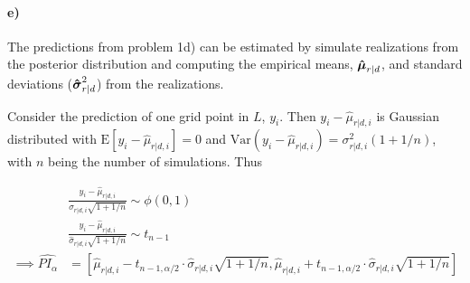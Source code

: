 \paragraph{e)}

The predictions from problem 1d) can be estimated by simulate realizations from the posterior distribution and computing the empirical means, $\boldsymbol{\mathbf{\hat\mu}}_{r|d}$, and standard deviations ($\boldsymbol{\mathbf{\hat\sigma}}^2_{r|d}$) from the realizations. 

Consider the prediction of one grid point in $L$, $y_i$. Then $y_i-\hat\mu_{r|d,i}$ is Gaussian distributed with $\text{E}[y_i-\hat\mu_{r|d,i}] = 0$ and $\text{Var}(y_i-\hat\mu_{r|d,i}) = \sigma^2_{r|d,i}(1+1/n)$, with $n$ being the number of simulations. Thus

\begin{align*}
    &\frac{y_i - \hat\mu_{r|d,i}}{\sigma_{r|d,i}\sqrt{1+1/n}} \sim \phi(0,1)\\
     &\frac{y_i - \hat\mu_{r|d,i}}{\hat\sigma_{r|d,i}\sqrt{1+1/n}} \sim t_{n-1}\\
     \implies \hat{PI_{\alpha}} &= \left[\hat\mu_{r|d,i} - t_{n-1,\alpha/2}\cdot\hat\sigma_{r|d,i}\sqrt{1+1/n}, \hat\mu_{r|d,i} + t_{n-1,\alpha/2}\cdot \hat\sigma_{r|d,i}\sqrt{1+1/n}\right]
\end{align*}



